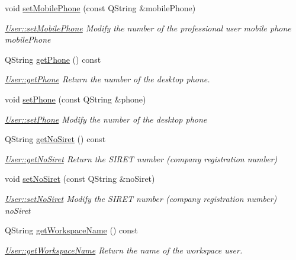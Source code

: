 \begin{DoxyCompactItemize}
void \hyperlink{classModels_1_1User_abed6684c24a3ba695a90a69a3a6d7572}{set\-Mobile\-Phone} (const Q\-String \&mobile\-Phone)
\begin{DoxyCompactList}\small\item\em \hyperlink{classModels_1_1User_abed6684c24a3ba695a90a69a3a6d7572}{User\-::set\-Mobile\-Phone} Modify the number of the professional user mobile phone {\itshape mobile\-Phone} \end{DoxyCompactList}\item 
Q\-String \hyperlink{classModels_1_1User_adc8fbd6d75a41d9ac9ee9473d781d1c1}{get\-Phone} () const 
\begin{DoxyCompactList}\small\item\em \hyperlink{classModels_1_1User_adc8fbd6d75a41d9ac9ee9473d781d1c1}{User\-::get\-Phone} Return the number of the desktop phone. \end{DoxyCompactList}\item 
void \hyperlink{classModels_1_1User_adb132ecafc7cc0afd42fc260f8a2e7b9}{set\-Phone} (const Q\-String \&phone)
\begin{DoxyCompactList}\small\item\em \hyperlink{classModels_1_1User_adb132ecafc7cc0afd42fc260f8a2e7b9}{User\-::set\-Phone} Modify the number of the desktop {\itshape phone} \end{DoxyCompactList}\item 
Q\-String \hyperlink{classModels_1_1User_a617ee9ede3791842fbf8593f08660d37}{get\-No\-Siret} () const 
\begin{DoxyCompactList}\small\item\em \hyperlink{classModels_1_1User_a617ee9ede3791842fbf8593f08660d37}{User\-::get\-No\-Siret} Return the S\-I\-R\-E\-T number (company registration number) \end{DoxyCompactList}\item 
void \hyperlink{classModels_1_1User_ae751ee06859dffce0cad08005c42c933}{set\-No\-Siret} (const Q\-String \&no\-Siret)
\begin{DoxyCompactList}\small\item\em \hyperlink{classModels_1_1User_ae751ee06859dffce0cad08005c42c933}{User\-::set\-No\-Siret} Modify the S\-I\-R\-E\-T number (company registration number) {\itshape no\-Siret} \end{DoxyCompactList}\item 
Q\-String \hyperlink{classModels_1_1User_adf4c52429656a4f44c15d879caee5b10}{get\-Workspace\-Name} () const 
\begin{DoxyCompactList}\small\item\em \hyperlink{classModels_1_1User_adf4c52429656a4f44c15d879caee5b10}{User\-::get\-Workspace\-Name} Return the name of the workspace user. \end{DoxyCompactList}\item 

\end{DoxyCompactItemize}
